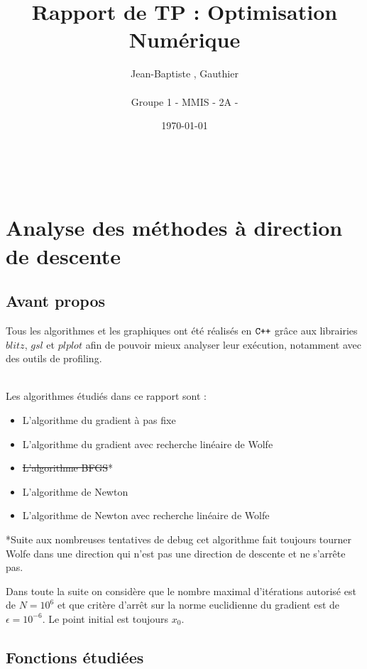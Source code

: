 \documentclass[a4paper,10pt]{article}
\title{\textbf{Rapport de TP : Optimisation Numérique}}
\author{Jean-Baptiste \bsc{Keck}, Gauthier \bsc{Zirnhelt} \\ \\ Groupe 1 - MMIS - 2A - \bsc{Ensimag}}
\date{\today}
\begin{document}


\maketitle
\hrulefill

\\
\vspace{5cm}
\section{Analyse des méthodes à direction de descente}

\vspace{0.5cm}
\subsection{Avant propos}

\hspace{0.4cm}
Tous les algorithmes et les graphiques ont été réalisés en $\verb!C++!$ grâce aux librairies $blitz$, $gsl$ et $plplot$ afin de pouvoir mieux analyser leur exécution, notamment avec des outils de profiling.

\\
\vspace{0.5cm}
\noindent Les algorithmes étudiés dans ce rapport sont : 
\begin{itemize}
	\item L'algorithme du gradient à pas fixe
	\item L'algorithme du gradient avec recherche linéaire de Wolfe
	\item \sout{L'algorithme BFGS}*
	\item L'algorithme de Newton
	\item L'algorithme de Newton avec recherche linéaire de Wolfe
\end{itemize}

*Suite aux nombreuses tentatives de debug cet algorithme fait toujours tourner Wolfe dans une direction qui n'est pas une direction de descente et ne s'arrête pas.

\vspace{0.5cm}
\noindent Dans toute la suite on considère que le nombre maximal d'itérations autorisé est de $N = 10^6$ et que critère d'arrêt sur la norme euclidienne du gradient est de $\epsilon = 10^{-6}$. Le point initial est toujours $x_0$.


\newpage
\subsection{Fonctions étudiées}
\vspace{0.5cm}
\end{document}
